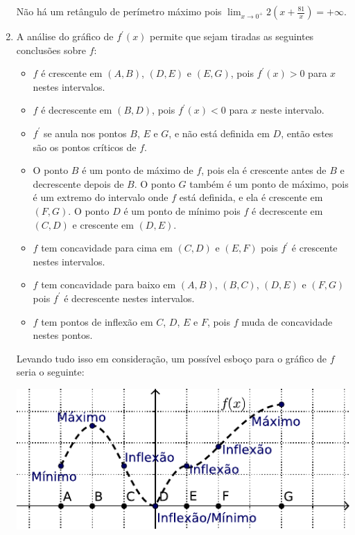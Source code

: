 \documentclass[12pt,a4paper]{article}
\begin{document}
\begin{enumerate}
Não há um retângulo de perímetro máximo pois $\lim_{x \to 0^+} 2\left(x + \frac{81}{x}\right) = +\infty$.

\item A análise do gráfico de $f^\prime(x)$ permite que sejam tiradas as seguintes conclusões sobre $f$:
\begin{itemize}
\item $f$ é crescente em $(A,B)$, $(D,E)$ e $(E,G)$, pois $f^\prime(x) > 0$ para $x$ nestes intervalos.
\item $f$ é decrescente em $(B,D)$, pois $f^\prime(x) < 0$ para $x$ neste intervalo.
\item $f^\prime$ se anula nos pontos $B$, $E$ e $G$, e não está definida em $D$, então estes são os pontos críticos de $f$.
\item O ponto $B$ é um ponto de máximo de $f$, pois ela é crescente antes de $B$ e decrescente depois de $B$. O ponto $G$ também é um ponto de máximo, pois é um extremo do intervalo onde $f$ está definida, e ela é crescente em $(F,G)$. O ponto $D$ é um ponto de mínimo pois $f$ é decrescente em $(C,D)$ e crescente em $(D,E)$.
\item $f$ tem concavidade para cima em $(C,D)$ e $(E,F)$ pois $f^\prime$ é crescente nestes intervalos.
\item $f$ tem concavidade para baixo em $(A,B)$, $(B,C)$, $(D,E)$ e $(F,G)$ pois $f^\prime$ é decrescente nestes intervalos.
\item $f$ tem pontos de inflexão em $C$, $D$, $E$ e $F$, pois $f$ muda de concavidade nestes pontos.
\end{itemize}
Levando tudo isso em consideração, um possível esboço para o gráfico de $f$ seria o seguinte:

\includegraphics[width=15cm]{img/prova-3-tads-4-primitiva}

\end{enumerate}
\end{document}
